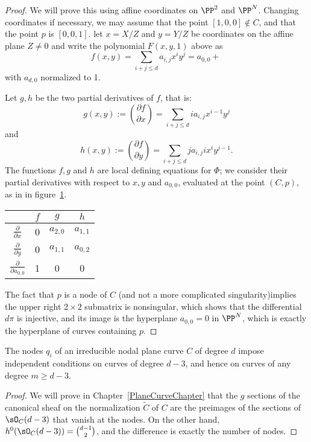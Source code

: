 \begin{proof}
We will prove this using affine coordinates on $\PP^2$ and $\PP^N$. Changing coordinates if necessary, we may assume that the point $[1,0,0] \notin C$, and that the point $p$ is $[0,0,1]$. let $x = X/Z$ and $y = Y/Z$ be coordinates on the affine plane $Z \neq 0$ and write the polynomial $F(x,y,1)$ above as
$$
f(x,y) = \sum_{i+j \leq d} a_{i,j} x^iy^j = a_{0,0} + \
$$
with $a_{d,0}$ normalized to 1. 

Let $g,h$ be the two partial derivatives of $f$, that is:
$$
g(x,y) := \binom{\partial f}{\partial x} = \sum_{i+j \leq d} i a_{i,j} x^{i-1}y^j
$$
and
$$
h(x,y) := \binom{\partial f}{\partial y} = \sum_{i+j \leq d} j a_{i,j} ix^{i}y^{j-1}.
$$
The functions $f, g$ and $h$ are local defining equations for $\Phi$; we consider their partial derivatives with respect to $x, y$ and $a_{0,0}$, evaluated at the point $(C,p)$, as in in figure~\ref{tang to Delta}.

\begin{table}[h!]\label{tang to Delta}
  \begin{center}
     \begin{tabular}{c|c|c|c} %
            & $f$ & $g$ & $h$ \\
      \hline
$\frac{\partial}{\partial x}$ & 0 & $a_{2,0}$ & $a_{1,1}$ \\
$\frac{\partial}{\partial y}$ & 0 & $a_{1,1}$ & $a_{0,2}$ \\
$\frac{\partial}{\partial a_{0,0}}$ & 1 & 0 & 0 
    \end{tabular}
  \end{center}
\end{table}

The fact that $p$ is a node of $C$ (and not a more complicated singularity)implies the upper right $2 \times 2$ submatrix is nonsingular, which shows that the differential $d\pi$ is injective, and its image is the hyperplane $a_{0,0} = 0$ in $\PP^N$, which is exactly the hyperplane of curves containing $p$.
\end{proof}

\begin{lemma}\label{adjoint independent}
The nodes $q_i$ of an irreducible nodal plane curve $C$ of degree $d$ impose independent conditions on curves of degree $d-3$, and hence on curves of any degree $m \geq d-3$.
\end{lemma}

\begin{proof}
We will prove in Chapter~\ref{PlaneCurveChapter} that the $g$ sections of the canonical sheaf on the normalization $\widetilde C$ of
$C$ are the preimages of the sections of $\sO_C(d-3)$ that vanish at the nodes. On the other hand, 
$h^0(\sO_C(d-3)) = \binom{d-1}{2}$, and the difference is exactly the number of nodes.
\end{proof}

